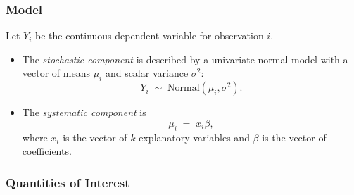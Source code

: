 \begin{enumerate}
%  
\end{enumerate}

\subsubsection{Model}
Let $Y_i$ be the continuous dependent variable for observation $i$.
\begin{itemize}
\item The \emph{stochastic component} is described by a univariate normal
  model with a vector of means $\mu_i$ and scalar variance $\sigma^2$:
  \begin{equation*}
    Y_i \; \sim \; \textrm{Normal}(\mu_i, \sigma^2). 
  \end{equation*}

\item The \emph{systematic component} is 
  \begin{equation*}
    \mu_i \;= \; x_i \beta,
  \end{equation*}
  where $x_i$ is the vector of $k$ explanatory variables and $\beta$ is
  the vector of coefficients.
\end{itemize}


\subsubsection{Quantities of Interest}

